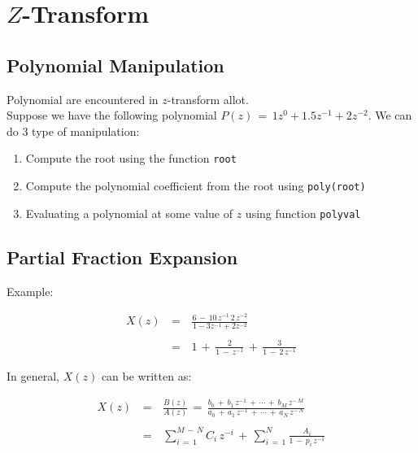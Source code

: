


\chapter{\texorpdfstring{$Z$}{Z}-Transform}

\section{Polynomial Manipulation}

Polynomial are encountered in $z$-transform allot.\\

Suppose we have the following polynomial $P(z) \, = \,1 z^0 + 1.5 z^{-1} + 2 z^{-2}$. We can do 3 type of manipulation:

\begin{enumerate}
    
\item Compute the root using the function \verb|root|

\item Compute the polynomial coefficient from the root using \verb|poly(root)|

\item Evaluating a polynomial at some value of $z$ using function \verb|polyval|

\end{enumerate}


\section{Partial Fraction Expansion}

Example:

\begin{equation}
\begin{array}{rcl}
    X(z) \, &=& \, \displaystyle\frac{6 \, - \, 10 \, z^{-1} \, 2 \, z^{-2}}{1 - 3 z^{-1} + 2 z^{-2}}  \\ \\
     &=& \, 1 \, + \,  \displaystyle\frac{2}{1 \, - \,z^{-1} } \, + \, \displaystyle\frac{3}{1 \, - \,2 \, z^{-1}}
\end{array}    
\end{equation}

In general, $X(z)$ can be written as:

\begin{equation}
\begin{array}{rcl}
X(z) \, &=& \, \displaystyle\frac{B(z)}{A(z)}   \, = \, \displaystyle\frac{b_0 \, + \, b_1 \, z^{-1} \, + \, \cdots \, + \, b_M \, z^{- \, M}}{a_0 \, + \, a_1 \, z^{-1} \, + \, \cdots \, + \, a_N \, z^{- \, N}} \\ \\
	    &=& \, \displaystyle\sum\limits_{i \, = \, 1}^{M \, - \, N} C_i \, z^{-i} \, + \,  \displaystyle\sum\limits_{i \, = \, 1}^N\frac{A_i}{1 \, - \, p_i \, z^{-1}}
 \end{array}
\end{equation}

